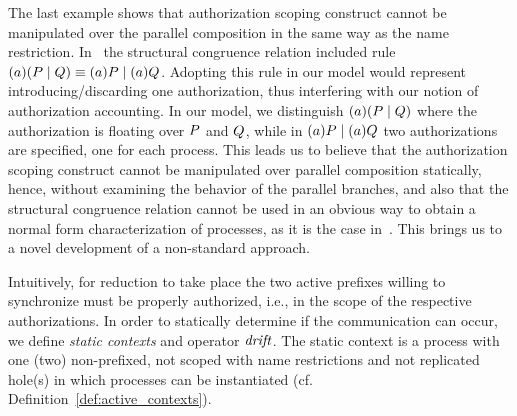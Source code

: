 The last example shows that authorization scoping construct cannot be manipulated over the parallel composition in the same way as the name restriction. In~\cite{clar:eke} the structural congruence relation included rule $(a)(P \;|\; Q)\equiv (a)P\;|\;(a)Q$. 
Adopting this rule in our model would represent introducing/discarding one authorization, thus interfering with our notion of authorization accounting. In our model, we distinguish $(a)(P \;|\; Q)$ where the authorization is floating over $P$ and $Q$, while in $(a)P\;|\;(a)Q$ two authorizations are specified, one for each process. %
%
%
This leads us to believe that the authorization scoping construct cannot be manipulated over parallel composition statically, hence, without examining the behavior of the parallel branches, and also that the structural congruence relation cannot be used in an obvious way to obtain a normal form characterization of processes, as it is the case in~\cite{clar:eke}.
This brings us to a novel development of a non-standard approach.
%

Intuitively, for reduction to take place the two active prefixes willing to synchronize must be properly authorized, i.e., in the scope of the respective authorizations. In order to statically determine if the communication can occur, we define \emph{static contexts} and operator $\mathit {drift}$. 
The static context is a process with one (two) non-prefixed, not scoped with name restrictions and not replicated hole(s) in which processes can be instantiated (cf. Definition~\ref{def:active_contexts}).



